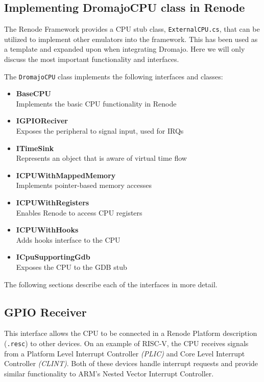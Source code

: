 \pagebreak

\subsection{Implementing DromajoCPU class in Renode}

The Renode Framework provides a CPU stub class, \texttt{ExternalCPU.cs}, that can be utilized to implement other
emulators into the framework. This has been used as a template and expanded upon when integrating Dromajo.
Here we will only discuss the most important functionality and interfaces.

\vspace{10px}
\noindent
The \texttt{DromajoCPU} class implements the following interfaces and classes:
\begin{multicols}{2}
    \begin{itemize}
        \item{\textbf{BaseCPU}\\Implements the basic CPU functionality in Renode}
        \item{\textbf{IGPIOReciver}\\Exposes the peripheral to signal input, used for IRQs}
        \item{\textbf{ITimeSink}\\Represents an object that is aware of virtual time flow}
        \item{\textbf{ICPUWithMappedMemory}\\Implements pointer-based memory accesses}
        \item{\textbf{ICPUWithRegisters}\\Enables Renode to access CPU registers}
        \item{\textbf{ICPUWithHooks}\\Adds hooks interface to the CPU}
        \item{\textbf{ICpuSupportingGdb}\\Exposes the CPU to the GDB stub}
    \end{itemize}
\end{multicols}

\noindent
The following sections describe each of the interfaces in more detail.

\subsection*{GPIO Receiver}
This interface allows the CPU to be connected in a Renode Platform description (\texttt{.resc}) to other devices.
On an example of RISC-V, the CPU receives signals from a Platform Level Interrupt Controller \textit{(PLIC)} and
Core Level Interrupt Controller \textit{(CLINT)}. Both of these devices handle interrupt requests and provide similar
functionality to ARM's Nested Vector Interrupt Controller.


